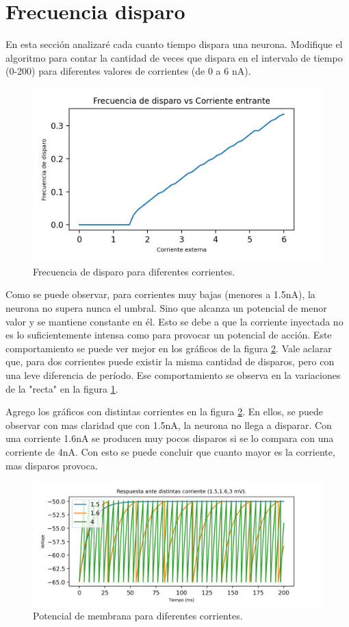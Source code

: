 \documentclass{article}
\begin{document}
\section*{Frecuencia disparo}
En esta sección analizaré cada cuanto tiempo dispara una neurona. Modifique el algoritmo para contar la cantidad de veces que dispara en el intervalo de tiempo (0-200) para diferentes valores de corrientes (de 0 a 6 nA).

\begin{figure}[H]
\centering
\includegraphics[width=\textwidth]{frecvscorri.png}
\caption{Frecuencia de disparo para diferentes corrientes.}
\label{frecuencia}
\end{figure}

 Como se puede observar, para corrientes muy bajas (menores a 1.5nA), la neurona no supera nunca el umbral. Sino que alcanza un potencial de menor valor y se mantiene constante en él. Esto se debe a que la corriente inyectada no es lo suficientemente intensa como para provocar un potencial de acción. Este comportamiento se puede ver mejor en los gráficos de la figura \ref{graficos}. Vale aclarar que, para dos corrientes puede existir la misma cantidad de disparos, pero con una leve diferencia de período. Ese comportamiento se observa en la variaciones de la "recta" en la figura \ref{frecuencia}.

Agrego los  gráficos con distintas corrientes en la figura \ref{graficos}. En ellos, se puede observar con mas claridad que con 1.5nA, la neurona no llega a disparar. Con una corriente 1.6nA se producen muy pocos disparos si se lo compara con una corriente de 4nA. 
Con esto se puede concluir que cuanto mayor es la corriente, mas disparos provoca.

\begin{figure}[H]
\centering
\includegraphics[width=\textwidth]{graficos.png}
\caption{Potencial de membrana para diferentes corrientes. }
\label{graficos}
\end{figure}
\end{document}
